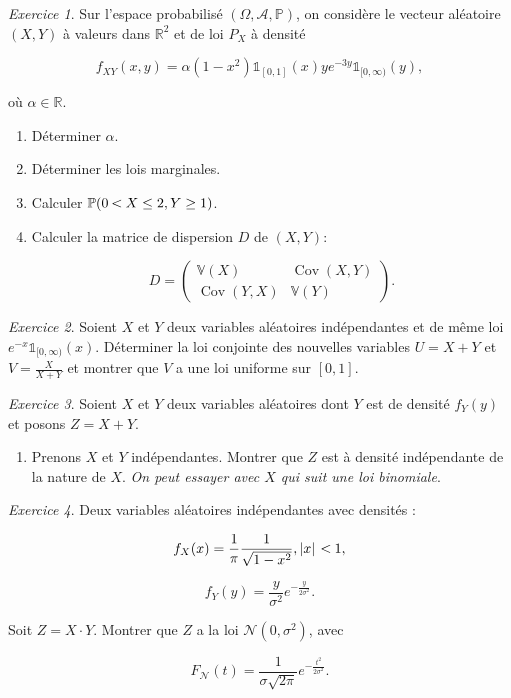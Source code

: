 \documentclass[french]{book}
\theoremstyle{definition}
\theoremstyle{remark}
\newtheorem{exo}{Exercice}
\newcommand{\lesss}{\rotatebox[origin=c]{90}{$\land$}}
\newcommand{\less}{\ \lesss\ }
\begin{document}
\begin{exo}
  Sur l'espace probabilisé \((\Omega, \mathscr{A}, \mathbb{P})\), on considère le vecteur aléatoire \((X, Y)\) à valeurs dans \(\mathbb{R}^2\) et de loi \(P_X\) à densité

  \[f _{XY}(x,y) = \alpha(1-x ^2) \mathds{1}_{[0, 1]}(x)y e^{-3y} \mathds{1}_{[0, \infty)}(y), \]

  où \(\alpha \in \mathbb{R}\).

  \begin{enumerate}
    \item Déterminer \(\alpha\).
    \item Déterminer les lois marginales.
    \item Calculer \(\mathbb{P}(0 \less X \leq 2, Y \geq 1)\).
    \item Calculer la matrice de dispersion \(D\) de \((X,Y)\):

    \[D= \left(\begin{matrix}
      \mathbb{V}(X) & \operatorname{Cov}(X,Y) \\
      \operatorname{Cov}(Y,X) & \mathbb{V}(Y)
    \end{matrix}\right).\]
  \end{enumerate}


\end{exo}

\begin{exo}
  Soient \(X\) et \(Y\) deux variables aléatoires indépendantes et de même loi \(e^{-x}\mathds{1}_{[0, \infty)}(x)\). Déterminer la loi conjointe des nouvelles variables \(U = X+Y\) et \(V = \displaystyle\frac{X}{X+Y}\) et montrer que \(V\) a une loi uniforme sur \([0,1]\).
\end{exo}

\begin{exo}
  Soient \(X\) et \(Y\) deux variables aléatoires dont \(Y\) est de densité \(f _{Y}(y)\) et posons \(Z = X+Y\).

  \begin{enumerate}
    \item Prenons \(X\) et \(Y\) indépendantes. Montrer que \(Z\) est à densité indépendante de la nature de \(X\). \emph{On peut essayer avec \(X\) qui suit une loi binomiale}.
  \end{enumerate}
\end{exo}

\begin{exo}
  Deux variables aléatoires indépendantes avec densités :

  \[f_X(x) = \frac{1}{\pi} \frac{1}{\sqrt{ 1- x ^2 }}, \left\lvert x \right\rvert \less 1,\]

  \[f_Y(y) = \frac{y}{\sigma ^2}e^{- \frac{y}{2 \sigma ^2}}.\]
  

  Soit \(Z = X \cdot Y\). Montrer que \(Z\) a la loi \(\mathscr{N}(0, \sigma^2)\), avec

  \[F _{\mathscr{N}}(t) = \frac{1}{\sigma \sqrt{ 2 \pi } } e^{-\frac{t ^2}{2 \sigma ^2}}.\]
\end{exo}
\end{document}
